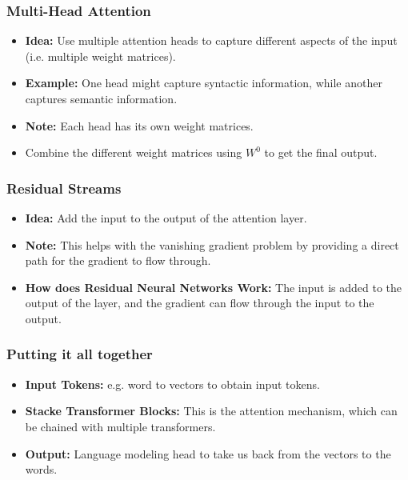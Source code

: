 \subsubsection{Multi-Head Attention}
\begin{definition}
    \begin{itemize}
        \item \textbf{Idea:} Use multiple attention heads to capture different aspects of the input (i.e. multiple weight matrices).
        \item \textbf{Example:} One head might capture syntactic information, while another captures semantic information.
        \item \textbf{Note:} Each head has its own weight matrices.
    \end{itemize}
    \begin{itemize}
        \item Combine the different weight matrices using $W^0$ to get the final output.
    \end{itemize}
\end{definition}

\subsubsection{Residual Streams}
\begin{definition}
    \begin{itemize}
        \item \textbf{Idea:} Add the input to the output of the attention layer.
        \item \textbf{Note:} This helps with the vanishing gradient problem by providing a direct path for the gradient to flow through.
        \item \textbf{How does Residual Neural Networks Work:} The input is added to the output of the layer, and the gradient can flow through the input to the output. 
    \end{itemize}
\end{definition}

\subsubsection{Putting it all together}
\begin{definition}
    \begin{itemize}
        \item \textbf{Input Tokens:} e.g. word to vectors to obtain input tokens.
        \item \textbf{Stacke Transformer Blocks:} This is the attention mechanism, which can be chained with multiple transformers.
        \item \textbf{Output:} Language modeling head to take us back from the vectors to the words. 
    \end{itemize}
\end{definition}

